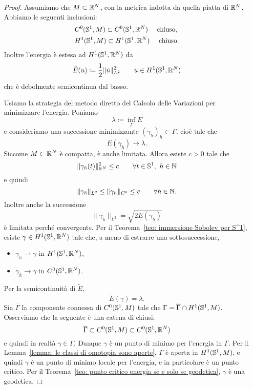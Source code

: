 \begin{proof}
	Assumiamo che \(M \subset \mathbb{R}^N\), con la metrica indotta da quella piatta di \(\mathbb{R}^N\). Abbiamo le seguenti inclusioni:
	\begin{align*}
		&C^0(\mathbb{S}^1,M) \subset C^0(\mathbb{S}^1, \mathbb{R}^N) \quad \text{ chiuso},  \\
		&H^1(\mathbb{S}^1,M) \subset H^1(\mathbb{S}^1, \mathbb{R}^N) \quad \text{ chiuso}.
	\end{align*}
	Inoltre l'energia è estesa ad \(H^1(\mathbb{S}^1,\mathbb{R}^N)\) da
	\[
		\widetilde{E}(u) \coloneq \frac{1}{2} \|\dot u\|^2_{L^2} \qquad u \in H^1(\mathbb{S}^1, \mathbb{R}^N)
	\]
	che è debolmente semicontinua dal basso. 
	
	Usiamo la strategia del metodo diretto del Calcolo delle Variazioni per minimizzare l'energia. Poniamo
	\[
		\lambda \coloneq \inf_\Gamma E
	\]
	e consideriamo una successione minimizzante \((\gamma_h)_h \subset \Gamma\), cioè tale che
	\[
		E(\gamma_h) \to \lambda.
	\]
	Siccome \(M \subset \mathbb{R}^N\) è compatta, è anche limitata. Allora esiste \(c>0\) tale che 
	\[
		\|\gamma_h(t) \|_{\mathbb{R}^N}^2 \leq c \qquad \forall t \in \mathbb{S}^1, \ h \in \mathbb{N}
	\]
	e quindi
	\[
		\|\gamma_h\|_{L^2} \leq \|\gamma_h\|_{C^0} \leq c \qquad \forall h \in \mathbb{N}.
	\]
	Inoltre anche la successione
	\[
		\|\dot \gamma_h \|_{L^2} = \sqrt{2E(\gamma_h)}
	\]
	è limitata perché convergente. Per il Teorema~\ref{teo: immersione Sobolev per S^1}, esiste \(\gamma \in H^1(\mathbb{S}^1,\mathbb{R}^N)\) tale che, a meno di estrarre una sottosuccessione,
	\begin{itemize}
		\item \(\gamma_h \rightharpoonup \gamma\) in \(H^1(\mathbb{S}^1,\mathbb{R}^N)\),
		\item \(\gamma_h \to \gamma \) in \(C^0(\mathbb{S}^1,\mathbb{R}^N)\).
	\end{itemize}
	Per la semicontinuità di \(\widetilde{E}\), 
	\[
		\widetilde{E}(\gamma) = \lambda.
	\]
	Sia \(\overline{\Gamma}\) la componente connessa di \(C^0(\mathbb{S}^1,M)\) tale che \(\Gamma= \overline{\Gamma} \cap H^1(\mathbb{S}^1,M)\). Osserviamo che la seguente è una catena di chiusi:
	\[
		\overline{\Gamma} \subset C^0(\mathbb{S}^1,M) \subset C^0(\mathbb{S}^1,\mathbb{R}^N)
	\]
	e quindi in realtà \(\gamma \in \Gamma\). Dunque \(\gamma\) è un punto di minimo per l'energia in \(\Gamma\). Per il Lemma~\ref{lemma: le classi di omotopia sono aperte}, \(\Gamma\) è aperta in \(H^1(\mathbb{S}^1,M)\), e quindi \(\gamma\) è un punto di minimo locale per l'energia, e in particolare è un punto critico. Per il Teorema~\ref{teo: punto critico energia se e solo se geodetica}, \(\gamma\) è una geodetica. 
\end{proof}


